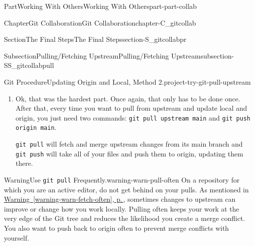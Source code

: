 \documentclass[twoside,10pt,]{book}
\newcommand{\xreffont}{\relax}
\newcommand{\mono}[1]{\texttt{#1}}
\newcommand{\initialism}[1]{\textsc{\MakeLowercase{#1}}}
\begin{document}
\begin{partptx}{Part}{Working With Others}{}{Working With Others}{}{}{part-part-collab}
\begin{chapterptx}{Chapter}{Git Collaboration}{}{Git Collaboration}{}{}{chapter-C_gitcollab}
\begin{sectionptx}{Section}{The Final Steps}{}{The Final Steps}{}{}{section-S_gitcollabpr}
\begin{subsectionptx}{Subsection}{Pulling\slash{}Fetching Upstream}{}{Pulling\slash{}Fetching Upstream}{}{}{subsection-SS_gitcollabpull}
\begin{project}{Git Procedure}{Updating Origin and Local, Method 2.}{project-try-git-pull-upstream}
\begin{enumerate}[font=\bfseries,label=(\alph*),ref=\alph*]
\begin{console}{0}{1}{0}
Please make sure you have the correct access rights
and the repository exists.
\end{console}
This is troublesome! Clearly upstream exists; how else would we have forked it? To fix this, you need to manually set the remote connection. Again, this only has to be done once per forked\slash{}cloned repo.%
\begin{enumerate}[font=\bfseries,label=(\roman*),ref=\theenumi.\roman*]%
\item{}Navigate to the authoritative repo's homepage and copy its \initialism{HTTPS} clone link, just as if you were going to clone the repo.%
\item{}Head back to your terminal and use \mono{git remote add upstream <https-link>}. There will be no output.%
\item{}Verify that it worked with \mono{git remote -v}. This will print out the HTTPS links for origin and upstream. Make sure your username is on the origin remotes and the official repo\slash{}username is on the upstream remotes.%
\end{enumerate}%
\item{}Ok, that was the hardest part. Once again, that only has to be done once. After that, every time you want to pull from upstream and update local and origin, you just need two commands: \mono{git pull upstream main} and \mono{git push origin main}.%
\par
\mono{git pull} will fetch and merge upstream changes from its main branch and \mono{git push} will take all of your files and push them to origin, updating them there.%
\end{enumerate}%
\end{project}%
\begin{warning}{Warning}{Use \mono{git pull} Frequently.}{warning-warn-pull-often}%
On a repository for which you are an active editor, do not get behind on your pulls. As mentioned in \hyperref[warning-warn-fetch-often]{Warning~{\xreffont\ref{warning-warn-fetch-often}}, p.\,\pageref{warning-warn-fetch-often}}, sometimes changes to upstream can improve or change how you work locally. Pulling often keeps your work at the very edge of the Git tree and reduces the likelihood you create a merge conflict. You also want to push back to origin often to prevent merge conflicts with yourself.%
\end{warning}
\end{subsectionptx}
\end{sectionptx}
%
%
\typeout{************************************************}

\end{chapterptx}
\end{partptx}
\end{document}
